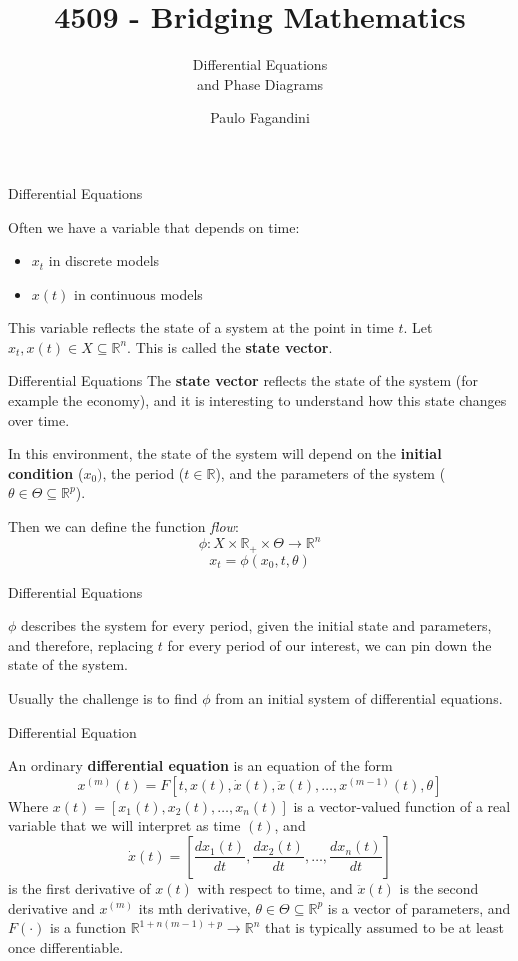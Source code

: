 \documentclass[aspectratio=169]{beamer}
\title[]{4509 - Bridging Mathematics}
\subtitle{Differential Equations\\ and Phase Diagrams}
\author[P. Fagandini]{Paulo Fagandini}
\institute{}
\date{}
\begin{document}
\begin{frame}{Differential Equations}

Often we have a variable that depends on time:

\begin{itemize}
    \item $x_t$ in discrete models
    \item $x(t)$ in continuous models
\end{itemize}

This variable reflects the state of a system at the point in time $t$. Let $x_t,x(t)\in X \subseteq \mathds{R}^n$. This is called the \textbf{state vector}.
    
\end{frame}

\begin{frame}{Differential Equations}
    The \textbf{state vector} reflects the state of the system (for example the economy), and it is interesting to understand how this state changes over time.
    
    In this environment, the state of the system will depend on the \textbf{initial condition} (\(x_0)\), the period (\(t\in\mathds{R}\)), and the parameters of the system (\(\theta\in\Theta\subseteq\mathds{R}^p\)).
    
    Then we can define the function \emph{flow}:
    \[\phi:X\times\mathds{R}_+\times\Theta\rightarrow \mathds{R}^n\] \[x_t=\phi(x_0,t,\theta)\]
\end{frame}

\begin{frame}{Differential Equations}

    $\phi$ describes the system for every period, given the initial state and parameters, and therefore, replacing $t$ for every period of our interest, we can pin down the state of the system.
    
    Usually the challenge is to find $\phi$ from an initial system of differential equations.
    
\end{frame}

\begin{frame}{Differential Equation}
    \begin{definition}
        An ordinary \textbf{differential equation} is an equation of the form \[x^{(m)}(t)=F[t,x(t),\dot{x}(t),\ddot{x}(t),\ldots,x^{(m-1)}(t),\theta]\]
        Where \(x(t)=[x_1(t),x_2(t),\ldots,x_n(t)]\) is a vector-valued function of a real variable that we will interpret as time $(t)$, and
        \[\dot{x}(t)=\left[\frac{d x_1(t)}{dt},\frac{d x_2(t)}{dt},\ldots,\frac{d x_n(t)}{dt}\right]\]
        is the first derivative of $x(t)$ with respect to time, and $\ddot{x}(t)$ is the second derivative and $x^{(m)}$ its mth derivative, \(\theta\in\Theta\subseteq\mathds{R}^p\) is a vector of parameters, and $F(\cdot)$ is a function $\mathds{R}^{1+n(m-1)+p}\rightarrow\mathds{R}^n$ that is typically assumed to be at least once differentiable.
    \end{definition}
\end{frame}
\end{document}
